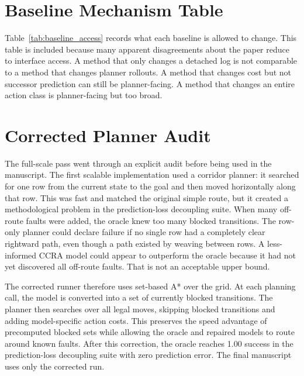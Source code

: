 \documentclass{article}
\begin{document}
\section{Baseline Mechanism Table}

Table~\ref{tab:baseline_access} records what each baseline is allowed to change. This table is included because many apparent disagreements about the paper reduce to interface access. A method that only changes a detached log is not comparable to a method that changes planner rollouts. A method that changes cost but not successor prediction can still be planner-facing. A method that changes an entire action class is planner-facing but too broad.

\begin{table}[h]
\centering
\small

\caption{Interface access of baselines. The experiments separate detached shielding, delayed batch update, thresholded exact update, immediate exact CCRA, broader guard CCRA, and oracle access.}
\label{tab:baseline_access}
\end{table}

\section{Corrected Planner Audit}

The full-scale pass went through an explicit audit before being used in the manuscript. The first scalable implementation used a corridor planner: it searched for one row from the current state to the goal and then moved horizontally along that row. This was fast and matched the original simple route, but it created a methodological problem in the prediction-loss decoupling suite. When many off-route faults were added, the oracle knew too many blocked transitions. The row-only planner could declare failure if no single row had a completely clear rightward path, even though a path existed by weaving between rows. A less-informed CCRA model could appear to outperform the oracle because it had not yet discovered all off-route faults. That is not an acceptable upper bound.

The corrected runner therefore uses set-based A* over the grid. At each planning call, the model is converted into a set of currently blocked transitions. The planner then searches over all legal moves, skipping blocked transitions and adding model-specific action costs. This preserves the speed advantage of precomputed blocked sets while allowing the oracle and repaired models to route around known faults. After this correction, the oracle reaches 1.00 success in the prediction-loss decoupling suite with zero prediction error. The final manuscript uses only the corrected run.
\end{document}
